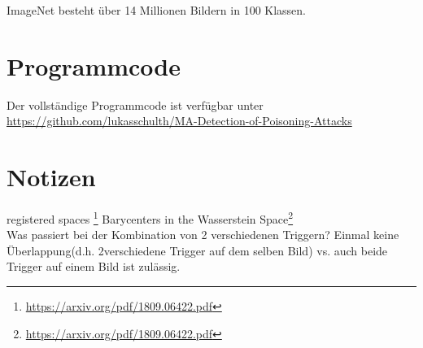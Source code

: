 \documentclass[11pt,a4paper]{article}
\numberwithin{equation}{section}
\begin{document}
	ImageNet besteht über 14 Millionen Bildern in 100 Klassen.
	\section{Programmcode}
	Der vollständige Programmcode ist verfügbar unter \url{https://github.com/lukasschulth/MA-Detection-of-Poisoning-Attacks}
	
	
	\section{Notizen}
	registered spaces \footnote{\url{https://arxiv.org/pdf/1809.06422.pdf}}
	Barycenters in the Wasserstein Space\footnote{\url{https://arxiv.org/pdf/1809.06422.pdf}}\\
	Was passiert bei der Kombination von 2 verschiedenen Triggern? Einmal keine Überlappung(d.h. 2verschiedene Trigger auf dem selben Bild) vs. auch beide Trigger auf einem Bild ist zulässig.
	\newpage
	
	\printglossaries
	
	\newpage
	
	
	
	
	
	
	
\end{document}
